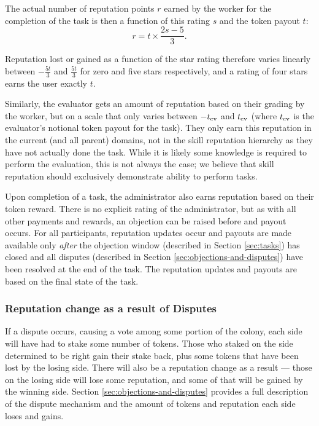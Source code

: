 The actual number of reputation points $r$ earned by the worker for the completion of the task is then a function of this rating $s$ and the token payout $t$:
\begin{equation*}\label{eq:stars-to-rep}
 r = t \times \frac{2s - 5}{3}.
\end{equation*}
 
Reputation lost or gained as a function of the star rating therefore varies linearly between $-\frac{5t}{3}$ and $\frac{5t}{3}$ for zero and five stars respectively, and a rating of four stars earns the user exactly $t$. 

Similarly, the evaluator gets an amount of reputation based on their grading by the worker, but on a scale that only varies between $-t_{\rm ev}$ and $t_{\rm ev}$ (where $t_{\rm ev}$ is the evaluator's notional token payout for the task). They only earn this reputation in the current (and all parent) domains, not in the skill reputation hierarchy as they have not actually done the task. While it is likely some knowledge is required to perform the evaluation, this is not always the case; we believe that skill reputation should exclusively demonstrate ability to perform tasks.

Upon completion of a task, the administrator also earns reputation based on their token reward. There is no explicit rating of the administrator, but as with all other payments and rewards, an objection can be raised before and payout occurs. For all participants, reputation updates occur and payouts are made available only \emph{after} the objection window (described in Section \ref{sec:tasks}) has closed and all disputes  (described in Section \ref{sec:objections-and-disputes}) have been resolved at the end of the task. The reputation updates and payouts are based on the final state of the task.

\subsubsection{Reputation change as a result of Disputes}\label{sec:earning-rep-in-disputes}
If a dispute occurs, causing a vote among some portion of the colony, each side will have had to stake some number of tokens. Those who staked on the side determined to be right gain their stake back, plus some tokens that have been lost by the losing side. There will also be a reputation change as a result --- those on the losing side will lose some reputation, and some of that will be gained by the winning side. Section \ref{sec:objections-and-disputes} provides a full description of the dispute mechanism and the amount of tokens and reputation each side loses and gains.

